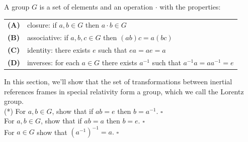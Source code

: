 \documentclass[12pt]{article}
\begin{document}
\noindent
A group $G$ is a set of elements and an operation $\cdot$ with the properties:
\begin{center}
\begin{tabular}{ll}
  {\bf (A)} & closure:  if $a,b \in G$ then $a \cdot b \in G$ \\
  {\bf (B)} & associative:  if $a,b,c \in G$ then $(ab)c = a(bc)$ \\
  {\bf (C)} & identity:  there exists $e$ such that $ea = ae = a$ \\
  {\bf (D)} & inverses:  for each $a \in G$ there exists $a^{-1}$ such that $a^{-1}a = a a^{-1} = e$ \\
\end{tabular}
\end{center}
In this section, we'll show that the set of transformations between
inertial references frames in special relativity form a group, which we call the Lorentz
group.\\[4pt]

\exercise (*) For $a,b \in G$, show that if $a b = e$ then $b = a^{-1}$.  $\square$ \\[3pt]

\exercise For $a,b \in G$, show that if $a b = a$ then $b = e$.  $\square$ \\[3pt]

\exercise For $a \in G$ show that $(a^{-1})^{-1} = a.$  $\square$ \\[3pt]
\end{document}

